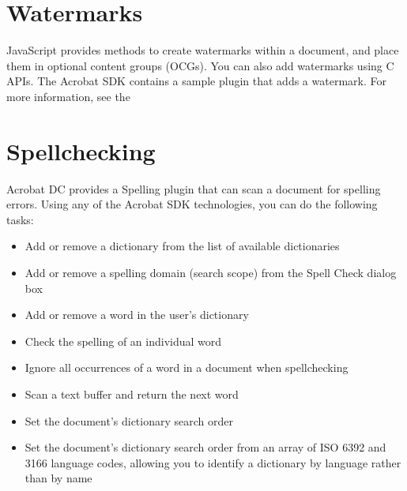 \documentclass[letterpaper,12pt,english,openany,oneside]{sphinxmanual}
\begin{document}
\section{Watermarks}
\label{\detokenize{Overview_Editing:watermarks}}
JavaScript provides methods to create watermarks within a document, and place them in optional content groups (OCGs). You can also add watermarks using C APIs. The Acrobat SDK contains a sample plug\sphinxhyphen{}in that adds a watermark. For more information, see the 




\section{Spell\sphinxhyphen{}checking}
\label{\detokenize{Overview_Editing:spell-checking}}
Acrobat DC provides a Spelling plug\sphinxhyphen{}in that can scan a document for spelling errors. Using any of the Acrobat SDK technologies, you can do the following tasks:
\begin{itemize}
\item {} 
Add or remove a dictionary from the list of available dictionaries

\item {} 
Add or remove a spelling domain (search scope) from the Spell Check dialog box

\item {} 
Add or remove a word in the user’s dictionary

\item {} 
Check the spelling of an individual word

\item {} 
Ignore all occurrences of a word in a document when spell\sphinxhyphen{}checking

\item {} 
Scan a text buffer and return the next word

\item {} 
Set the document’s dictionary search order

\item {} 
Set the document’s dictionary search order from an array of ISO 639\sphinxhyphen{}2 and 3166 language codes, allowing you to identify a dictionary by language rather than by name

\end{itemize}
\end{document}
